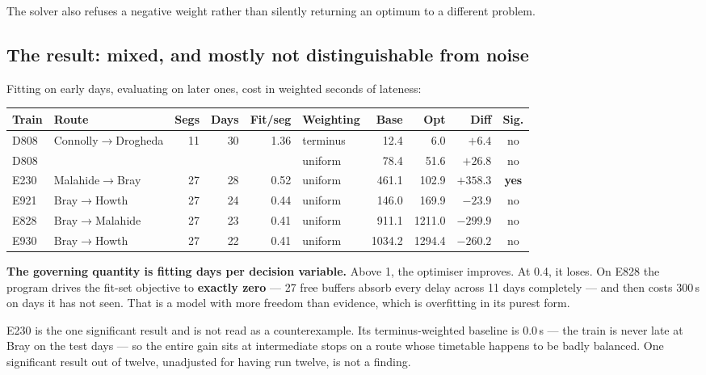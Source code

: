 \documentclass[11pt,a4paper]{article}
\begin{document}
The solver also refuses a negative weight rather than silently returning an optimum to a
different problem.

\subsection*{The result: mixed, and mostly not distinguishable from noise}

Fitting on early days, evaluating on later ones, cost in weighted seconds of lateness:

\begin{center}
\small
\begin{tabular}{@{}llrrrlrrrc@{}}
\toprule
\textbf{Train} & \textbf{Route} & \textbf{Segs} & \textbf{Days} & \textbf{Fit/seg} &
\textbf{Weighting} & \textbf{Base} & \textbf{Opt} & \textbf{Diff} & \textbf{Sig.} \\
\midrule
D808 & Connolly$\to$Drogheda & 11 & 30 & 1.36 & terminus & 12.4 & 6.0 & $+6.4$ & no \\
D808 & & & & & uniform & 78.4 & 51.6 & $+26.8$ & no \\
E230 & Malahide$\to$Bray & 27 & 28 & 0.52 & uniform & 461.1 & 102.9 & $+358.3$ & \textbf{yes} \\
E921 & Bray$\to$Howth & 27 & 24 & 0.44 & uniform & 146.0 & 169.9 & $-23.9$ & no \\
E828 & Bray$\to$Malahide & 27 & 23 & 0.41 & uniform & 911.1 & 1211.0 & $-299.9$ & no \\
E930 & Bray$\to$Howth & 27 & 22 & 0.41 & uniform & 1034.2 & 1294.4 & $-260.2$ & no \\
\bottomrule
\end{tabular}
\end{center}

\begin{keybox}
\textbf{The governing quantity is fitting days per decision variable.} Above 1, the optimiser
improves. At 0.4, it loses. On E828 the program drives the fit-set objective to
\textbf{exactly zero} --- 27 free buffers absorb every delay across 11 days completely --- and
then costs 300\,s on days it has not seen. That is a model with more freedom than evidence,
which is overfitting in its purest form.
\end{keybox}

\noindent E230 is the one significant result and is not read as a counterexample. Its
terminus-weighted baseline is 0.0\,s --- the train is never late at Bray on the test days ---
so the entire gain sits at intermediate stops on a route whose timetable happens to be badly
balanced. One significant result out of twelve, unadjusted for having run twelve, is not a
finding.
\end{document}
